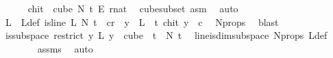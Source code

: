 \begin{isabellebody}
\ \ \ \ \isamarkupfalse%
\ {\isachardoublequoteopen}{\isacharquery}{\kern0pt}chi{\isacharunderscore}{\kern0pt}t\ {\isasymin}\ cube\ N{\isacharprime}{\kern0pt}\ t\ {\isasymrightarrow}\isactrlsub E\ {\isacharbraceleft}{\kern0pt}{\isachardot}{\kern0pt}{\isachardot}{\kern0pt}{\isacharless}{\kern0pt}r{\isacharcolon}{\kern0pt}{\isacharcolon}{\kern0pt}nat{\isacharbraceright}{\kern0pt}{\isachardoublequoteclose}\ \isamarkupfalse%
\ cube{\isacharunderscore}{\kern0pt}subset\ asm\ \isamarkupfalse%
\ auto\isanewline
\ \ \ \ \isamarkupfalse%
\ \isamarkupfalse%
\ L\ \ L{\isacharunderscore}{\kern0pt}def{\isacharcolon}{\kern0pt}\ {\isachardoublequoteopen}is{\isacharunderscore}{\kern0pt}line\ L\ N{\isacharprime}{\kern0pt}\ t\ {\isasymand}\ {\isacharparenleft}{\kern0pt}{\isasymexists}c{\isacharless}{\kern0pt}r{\isachardot}{\kern0pt}\ \ {\isacharparenleft}{\kern0pt}{\isasymforall}y\ {\isasymin}\ L\ {\isacharbackquote}{\kern0pt}\ {\isacharbraceleft}{\kern0pt}{\isachardot}{\kern0pt}{\isachardot}{\kern0pt}{\isacharless}{\kern0pt}t{\isacharbraceright}{\kern0pt}{\isachardot}{\kern0pt}\ {\isacharquery}{\kern0pt}chi{\isacharunderscore}{\kern0pt}t\ y\ {\isacharequal}{\kern0pt}\ c{\isacharparenright}{\kern0pt}{\isacharparenright}{\kern0pt}{\isachardoublequoteclose}\ \isamarkupfalse%
\ N{\isacharprime}{\kern0pt}{\isacharunderscore}{\kern0pt}props\ \isamarkupfalse%
\ blast\isanewline
\isanewline
\ \ \ \ \isamarkupfalse%
\ {\isachardoublequoteopen}is{\isacharunderscore}{\kern0pt}subspace\ {\isacharparenleft}{\kern0pt}restrict\ {\isacharparenleft}{\kern0pt}{\isasymlambda}y{\isachardot}{\kern0pt}\ L\ {\isacharparenleft}{\kern0pt}y\ {}{\isacharparenright}{\kern0pt}{\isacharparenright}{\kern0pt}\ {\isacharparenleft}{\kern0pt}cube\ {}\ t{\isacharparenright}{\kern0pt}{\isacharparenright}{\kern0pt}\ {}\ N{\isacharprime}{\kern0pt}\ t{\isachardoublequoteclose}\ \isamarkupfalse%
\ line{\isacharunderscore}{\kern0pt}is{\isacharunderscore}{\kern0pt}dim{}{\isacharunderscore}{\kern0pt}subspace\ N{\isacharprime}{\kern0pt}{\isacharunderscore}{\kern0pt}props\ L{\isacharunderscore}{\kern0pt}def\ \isanewline
\ \ \ \ \ \ \isamarkupfalse%
\ assms{\isacharparenleft}{\kern0pt}{}{\isacharparenright}{\kern0pt}\ \isamarkupfalse%
\ auto\ \isanewline
\ \ \ \ \isamarkupfalse%
\ \isamarkupfalse%

\end{isabellebody}
